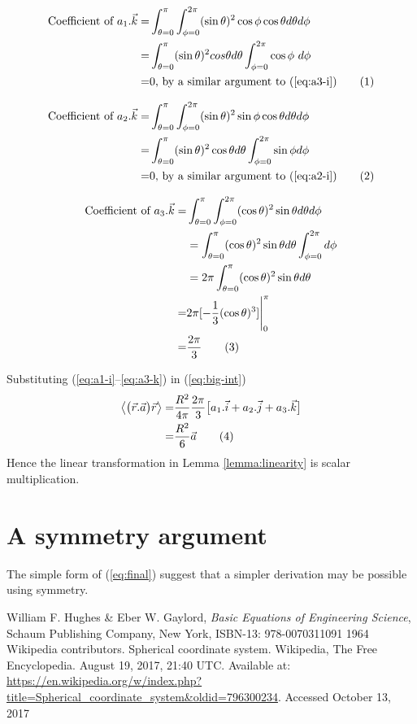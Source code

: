 \documentclass[]{article}
\newcommand\numberthis{\addtocounter{equation}{1}\tag{\theequation}}
\begin{document}
\begin{align*}
\text{Coefficient of }a_1.\vec{k} =&\int_{\theta=0}^{\pi}\int_{\phi=0}^{2\pi}(\sin\theta)^2\cos\phi\cos\theta d\theta d\phi\\=&
\int_{\theta=0}^{\pi}  (\sin\theta)^2 cos\theta d\theta \int_{\phi=0}^{2\pi}\cos\phi\ d\phi\\
=&0 \text{, by a similar argument to (\ref{eq:a3-i})} \numberthis \label{eq:a1-k}
\end{align*}

\begin{align*}
\text{Coefficient of }a_2.\vec{k} =&\int_{\theta=0}^{\pi}\int_{\phi=0}^{2\pi}(\sin\theta)^2\sin\phi\cos\theta d\theta d\phi\\=&
\int_{\theta=0}^{\pi} (\sin\theta)^2 \cos\theta d\theta \int_{\phi=0}^{2\pi}\sin\phi d\phi\\=&0 \text{, by a similar argument to (\ref{eq:a2-i})} \numberthis \label{eq:a2-k}
\end{align*}

\begin{align*}
\text{Coefficient of }a_3.\vec{k} =&\int_{\theta=0}^{\pi} \int_{\phi=0}^{2\pi} (\cos\theta)^2\sin\theta d\theta   d\phi\\ &= \int_{\theta=0}^{\pi} (\cos\theta)^2\sin\theta d\theta  \int_{\phi=0}^{2\pi} d\phi \\ &= 2 \pi \int_{\theta=0}^{\pi} (\cos\theta)^2\sin\theta d\theta \\
=& 2\pi[-\frac{1}{3}(\cos\theta)^3] \Bigg|_0^{\pi} \\
=& \frac{2\pi}{3}\numberthis \label{eq:a3-k}
\end{align*}

Substituting (\ref{eq:a1-i}--\ref{eq:a3-k})  in (\ref{eq:big-int})
\begin{align*}
\left\langle \big(\vec{r}.\vec{a}\big)\vec{r} \right\rangle=&\frac{ R^2}{4\pi}\frac{2\pi}{3}\big[a_1.\vec{i}+a_2.\vec{j}+a_3.\vec{k}\big]\\
=&\frac{R^2}{6}\vec{a} \numberthis \label{eq:final}
\end{align*}
Hence the linear transformation in Lemma \ref{lemma:linearity}  is scalar multiplication.

\section{A symmetry argument}
The simple form of (\ref{eq:final}) suggest that a simpler derivation may be possible using symmetry.
\begin{thebibliography}{9}
	\raggedright
	William F. Hughes \& Eber W. Gaylord,
	\emph{Basic Equations of Engineering Science},
	Schaum Publishing Company, New York,
	ISBN-13: 978-0070311091
	1964
	Wikipedia contributors. Spherical coordinate system. Wikipedia, The Free Encyclopedia. August 19, 2017, 21:40 UTC. Available at: 
	\url{https://en.wikipedia.org/w/index.php?title=Spherical_coordinate_system&oldid=796300234}.
	Accessed
	October 13, 2017
\end{thebibliography}
\end{document}
